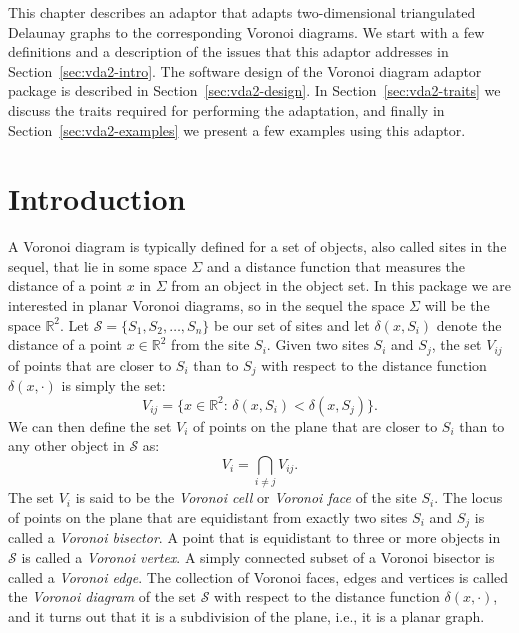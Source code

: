 
This chapter describes an adaptor that adapts two-dimensional
triangulated Delaunay graphs to the corresponding Voronoi diagrams.
We start with a few
definitions and a description of the issues that this adaptor
addresses in Section~\ref{sec:vda2-intro}. The software design
of the Voronoi diagram adaptor package is described in
Section~\ref{sec:vda2-design}. In Section~\ref{sec:vda2-traits} we
discuss the traits required for performing the adaptation, and finally
in Section~\ref{sec:vda2-examples} we present a few examples using
this adaptor.

\section{Introduction\label{sec:vda2-intro}}

A Voronoi diagram is typically defined for a set of objects, also
called sites in the sequel, that lie in some space $\Sigma$ and a
distance function that measures the distance of a point $x$ in
$\Sigma$ from an object in the object set. In this package we are
interested in planar Voronoi diagrams, so in the sequel the space
$\Sigma$ will be the space $\mathbb{R}^2$. 
Let $\mathcal{S}=\{S_1,S_2,\ldots,S_n\}$ be our set of sites and let
$\delta(x,S_i)$ denote the distance of a point $x\in\mathbb{R}^2$ from
the site $S_i$. Given two sites $S_i$ and $S_j$, the set $V_{ij}$
of points that are closer to $S_i$ than to $S_j$ with respect to the
distance function $\delta(x,\cdot)$ is simply the set:
\[   V_{ij} = \{x\in\mathbb{R}^2:\, \delta(x,S_i)<\delta(x,S_j)\}. \]
We can then define the set $V_i$ of points on the plane that are closer to
$S_i$ than to any other object in $\mathcal{S}$ as:
\[  V_i = \bigcap_{i\neq j} V_{ij}. \]
The set $V_i$ is said to be the \emph{Voronoi cell} or \emph{Voronoi face} 
of the site $S_i$. The locus of points on the plane that are
equidistant from exactly two sites $S_i$ and $S_j$ is called a
\emph{Voronoi bisector}. A point that is equidistant to three or
more objects in $\mathcal{S}$ is called a \emph{Voronoi vertex}.
A simply connected subset of a Voronoi bisector is called a
\emph{Voronoi edge}.
The collection of Voronoi faces, edges and vertices is called the
\emph{Voronoi diagram} of the set $\mathcal{S}$ with respect to the
distance function $\delta(x,\cdot)$, and it turns out that it is a
subdivision of the plane, i.e., it is a planar graph.

